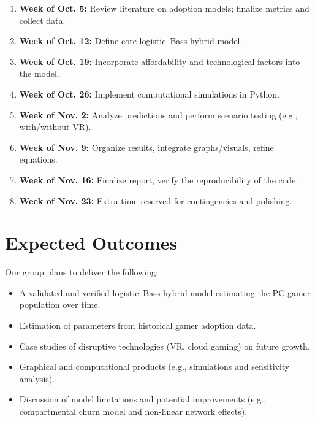 \documentclass{article}
\begin{document}
\begin{enumerate} [nosep]
    \item \textbf{Week of Oct. 5:} Review literature on adoption models; finalize metrics and collect data.
    \item \textbf{Week of Oct. 12:} Define core logistic--Bass hybrid model.
    \item \textbf{Week of Oct. 19:} Incorporate affordability and technological factors into the model.
    \item \textbf{Week of Oct. 26:} Implement computational simulations in Python.
    \item \textbf{Week of Nov. 2:} Analyze predictions and perform scenario testing (e.g., with/without VR).
    \item \textbf{Week of Nov. 9:} Organize results, integrate graphs/visuals, refine equations.
    \item \textbf{Week of Nov. 16:} Finalize report, verify the reproducibility of the code.
    \item \textbf{Week of Nov. 23:} Extra time reserved for contingencies and polishing.
\end{enumerate}



\section{Expected Outcomes}
Our group plans to deliver the following: 
\begin{itemize} [nosep]
    \item A validated and verified logistic–Bass hybrid model estimating the PC gamer population over time.
    \item Estimation of parameters from historical gamer adoption data.
    \item Case studies of disruptive technologies (VR, cloud gaming) on future growth.
    \item Graphical and computational products (e.g., simulations and sensitivity analysis).
    \item Discussion of model limitations and potential improvements (e.g., compartmental churn model and non-linear network effects).

\end{itemize}



\end{document}
